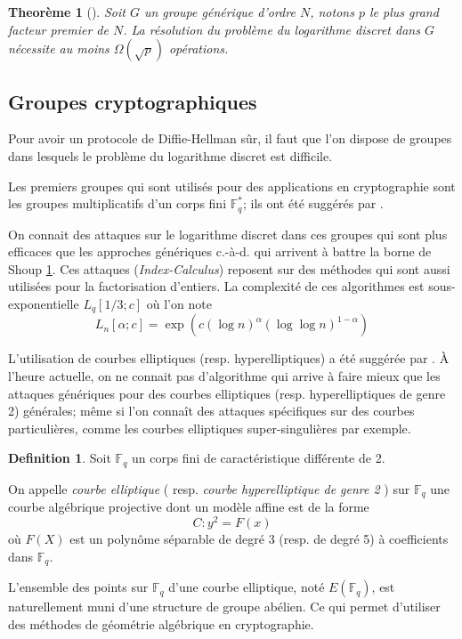 \documentclass[a4paper]{article}
\newtheorem{theoreme}{Theorème}[section]
\theoremstyle{definition}
\newtheorem{definition}{Definition}[section]
\theoremstyle{remark}
\numberwithin{equation}{section}
\begin{document}
\begin{theoreme}[\citet{shoup}]
\label{borneShoup}
Soit $G$ un groupe générique d'ordre $N$, notons $p$ le plus grand facteur premier de $N$. La résolution du problème du logarithme discret dans $G$ nécessite au moins $\Omega(\sqrt{p})$ opérations. 
\end{theoreme}

\subsection{Groupes cryptographiques}
Pour avoir un protocole de Diffie-Hellman sûr, il faut que l'on dispose de groupes dans lesquels le problème du logarithme discret est difficile.

Les premiers groupes qui sont utilisés pour des applications en cryptographie sont les groupes multiplicatifs d'un corps fini $\mathbb{F}^*_q$; ils ont été suggérés par \citet{diffie-hellman}.

On connait des attaques sur le logarithme discret dans ces groupes qui sont plus efficaces que les approches génériques c.-à-d. qui arrivent à battre la borne de Shoup \ref{borneShoup}. Ces attaques (\emph{Index-Calculus}) reposent sur des méthodes qui sont aussi utilisées pour la factorisation d'entiers. La complexité de ces algorithmes est sous-exponentielle $L_q[1/3;c]$ où l'on note
$$L_n[\alpha;c] = \exp(c(\log n)^\alpha(\log \log n)^{1-\alpha})$$

L'utilisation de courbes elliptiques (resp. hyperelliptiques) a été suggérée par \citet{koblitz1,koblitz2}. À l'heure actuelle, on ne connait pas d'algorithme qui arrive à faire mieux que les attaques génériques pour des courbes elliptiques (resp. hyperelliptiques de genre 2) générales; même si l'on connaît des attaques spécifiques sur des courbes particulières, comme les courbes elliptiques super-singulières par exemple.

\begin{definition}
Soit $\mathbb{F}_q$ un corps fini de caractéristique différente de 2.

On appelle \emph{courbe elliptique} ( resp. \emph{courbe hyperelliptique de genre 2} ) sur $\mathbb{F}_q$ une courbe algébrique projective dont un modèle affine est de la forme
$$C : y^2 = F(x)$$
où $F(X)$ est un polynôme séparable de degré 3 (resp. de degré 5) à coefficients dans $\mathbb{F}_q$.
\end{definition}

L'ensemble des points sur $\mathbb{F}_q$ d'une courbe elliptique, noté $E(\mathbb{F}_q)$, est naturellement muni d'une structure de groupe abélien. Ce qui permet d'utiliser des méthodes de géométrie algébrique en cryptographie.
\end{document}
